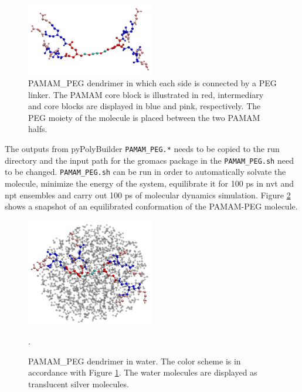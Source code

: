 \begin{figure}
    \centering
    \includegraphics[width=0.5\textwidth]{PAMAM_PEG/PAMAM_PEG_PPB.pdf}
    \caption{PAMAM\_PEG dendrimer in which each side is connected by a PEG linker. The PAMAM core block is illustrated in red, intermediary and core blocks are displayed in blue and pink, respectively. The PEG moiety of the molecule is placed between the two PAMAM halfs.}
    \label{fig:PAMAMPEGPPB}
\end{figure}

The outputs from pyPolyBuilder \texttt{PAMAM\_PEG.*} needs to be copied to the run directory and the input path for the gromacs package in the \texttt{PAMAM\_PEG.sh} need to be changed.
\texttt{PAMAM\_PEG.sh} can be run in order to automatically solvate the molecule, minimize the energy of the system, equilibrate it for 100 ps in nvt and npt ensembles and carry out 100 ps of molecular dynamics simulation.
Figure \ref{fig:PAMAMPEGSOL} shows a snapshot of an equilibrated conformation of the PAMAM-PEG molecule.

\begin{figure}
    \centering
    \includegraphics[width=0.5\textwidth]{PAMAM_PEG/PAMAM_PEG_SOL.pdf}
    \caption{PAMAM\_PEG dendrimer in water. The color scheme is in accordance with Figure \ref{fig:PAMAMPEGPPB}. The water molecules are displayed as translucent silver molecules.}.
    \label{fig:PAMAMPEGSOL}
\end{figure}
